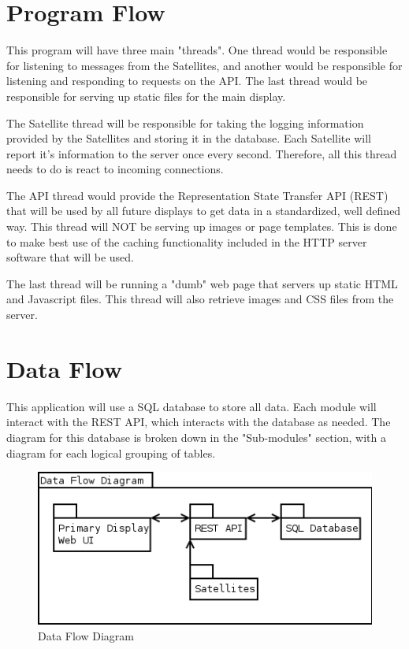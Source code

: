\section{Program Flow}

This program will have three main "threads".
One thread would be responsible for listening to messages from the Satellites, and another would be responsible for listening and responding to requests on the API.
The last thread would be responsible for serving up static files for the main display.

The Satellite thread will be responsible for taking the logging information provided by the Satellites and storing it in the database.
Each Satellite will report it's information to the server once every second.
Therefore, all this thread needs to do is react to incoming connections.

The API thread would provide the Representation State Transfer API (REST) that will be used by all future displays to get data in a standardized, well defined way.
This thread will NOT be serving up images or page templates.
This is done to make best use of the caching functionality included in the HTTP server software that will be used.

The last thread will be running a "dumb" web page that servers up static HTML and Javascript files.
This thread will also retrieve images and CSS files from the server.

\section{Data Flow}

This application will use a SQL database to store all data.
Each module will interact with the REST API, which interacts with the database as needed.
The diagram for this database is broken down in the "Sub-modules" section, with a diagram for each logical grouping of tables.

\begin{figure}[H]
\centering
\includegraphics[scale=0.75]{Software/images/DataFlowDiagram.png}
\caption{Data Flow Diagram}
\label{img:S_DataFlowDiagram}
\end{figure}

